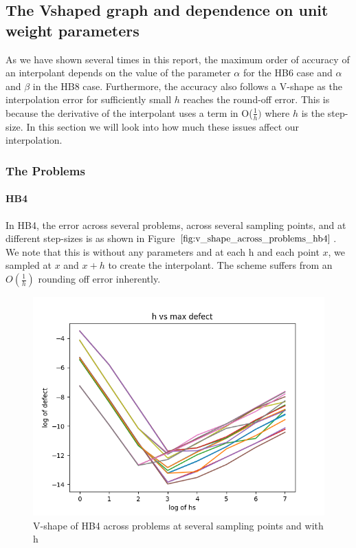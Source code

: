 \documentclass{article}
\begin{document}
\subsection{The Vshaped graph and dependence on unit weight parameters}
\label{section:v_shaped_graph}
As we have shown several times in this report, the maximum order of accuracy of an interpolant depends on the value of the parameter $\alpha$ for the HB6 case and $\alpha$ and $\beta$ in the HB8 case. Furthermore, the accuracy also follows a V-shape as the interpolation error for sufficiently small $h$ reaches the round-off error. This is because the derivative of the interpolant uses a term in O($\frac{1}{h})$ where $h$ is the step-size. In this section we will look into how much these issues affect our interpolation. 

\subsubsection{The Problems}
\paragraph{HB4}
In HB4, the error across several problems, across several sampling points, and at different step-sizes is as shown in Figure $\ref{fig:v_shape_across_problems_hb4}$. We note that this is without any parameters and at each h and each point $x$, we sampled at $x$ and $x + h$ to create the interpolant. The scheme suffers from an $O(\frac{1}{h})$ rounding off error inherently.
\begin{figure}[H]
\centering
\includegraphics[width=0.7\linewidth]{./figures/v_shape_across_problems_hb4}
\caption{V-shape of HB4 across problems at several sampling points and with h}
\label{fig:v_shape_across_problems_hb4}
\end{figure}
\end{document}
